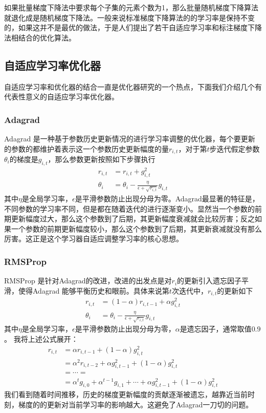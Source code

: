 \documentclass[twoside,a4paper,12pt]{book}%
\begin{document}
如果批量梯度下降法中要求每个子集的元素个数为1，那么批量随机梯度下降算法就退化成是随机梯度下降法。一般来说标准梯度下降算法的的学习率是保持不变的，如果这并不是最优的做法，于是人们提出了若干自适应学习率和标注梯度下降法相结合的优化算法。
\subsection{自适应学习率优化器}
自适应学习率和优化器的结合一直是优化器研究的一个热点，下面我们介绍几个有代表性意义的自适应学习率优化器。
\subsubsection{Adagrad}
Adagrad 是一种基于参数历史更新情况的进行学习率调整的优化器，每个要更新的参数的都维护着表示这一个参数历史更新幅度的量$r_{i,t}$，对于第$t$步迭代假定参数$\theta_i$的梯度是$g_{i,t}$，那么参数更新按照如下步骤执行
$$
\begin{aligned}
r_{i,t} &= r_{i,t} + g_{i,t}^2 \\
\theta_i &= \theta_i-\frac{\eta}{\epsilon + \sqrt{r_{i,t}}}g_{i,t}
\end{aligned}
$$
其中$\eta$是全局学习率，$\epsilon$是平滑参数防止出现分母为零。Adagrad最显著的特征是，不同参数的学习率不同，但是都在随着迭代的进行逐渐变小。显然当一个参数的前期更新幅度过大，那么这个参数到了后期，其更新幅度衰减就会比较厉害；反之如果一个参数的前期更新幅度较小，那么这个参数到了后期，其更新衰减就没有那么厉害。这正是这个学习器自适应调整学习率的核心思想。
\subsubsection{RMSProp}
RMSProp 是针对Adagrad的改进，改进的出发点是对$r_i$的更新引入遗忘因子平滑，使得Adagrad 能够平衡历史和眼前。具体来说第$t$次迭代中，$r_{i,t}$的更新如下
$$
\begin{aligned}
r_{i,t}&=(1-\alpha)r_{i,t-1}+\alpha g_{i,t}^2\\
\theta_i &= \theta_i-\frac{\eta}{\epsilon + \sqrt{r_{i,t}}}g_{i,t}
\end{aligned}
$$
其中$\eta$是全局学习率，$\epsilon$是平滑参数防止出现分母为零，$\alpha$是遗忘因子，通常取值$0.9$。
我将上述公式展开：
$$
\begin{aligned}
r_{i,t}&=\alpha r_{i,t-1}+(1-\alpha) g_{i,t}^2\\
       &=\alpha^2r_{i,t-2}+\alpha g_{i,t-1}^2+(1-\alpha) g_{i,t}^2 \\
       &=\cdots=\\
       &=\alpha^t g_{i,0} +  \alpha^{t-1} g_{i,1} + \cdots + \alpha g_{i,t-1}^2+(1-\alpha) g_{i,t}^2
\end{aligned}
$$
我们看到随着时间推移，历史的梯度更新幅度的贡献逐渐被遗忘，越靠近当前时刻，梯度的的更新对当前学习率的影响越大。这避免了Adagrad一刀切的问题。
\end{document}
